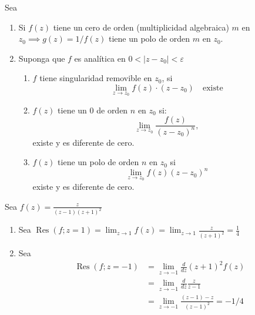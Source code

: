 \begin{nota}
    Sea 
    \begin{enumerate}
        \item Si $f(z)$ tiene un cero de orden (multiplicidad algebraica) $m$ en $z_0\implies g(z)=1/f(z)$ tiene un polo de orden $m$ en $z_0$.
        \item Suponga que $f$ es analítica en $0<|z-z_0|<\varepsilon$
        \begin{enumerate}
            \item $f$ tiene singularidad removible en $z_0$, si 
            $$\lim_{z\to z_0}f(z)\cdot (z-z_0)\quad \text{existe}$$
            \item $f(z)$ tiene un 0 de orden $n$ en $z_0$ si:
            $$\lim_{z\to z_0}\frac{f(z)}{(z-z_0)^n},$$
            existe y es diferente de cero. 
            \item $f(z)$ tiene un polo de orden $n$ en $z_0$ si 
            $$\lim_{z\to z_0}f(z)(z-z_0)^n$$
            existe y es diferente de cero.
        \end{enumerate}
    \end{enumerate}
\end{nota}
\begin{ejemplo}
    Sea $f(z)=\frac{z}{(z-1)(z+1)^2}$
    \begin{enumerate}
        \item Sea $\operatorname{Res}(f;z=1)=\lim_{z\to 1}f(z)=\lim_{z\to 1}\frac{z}{(z+1)^2}=\frac{1}{4}$
        \item Sea 
        \begin{align*}
            \operatorname{Res}(f;z=-1) &=\lim_{z\to -1}\frac{d}{dz}(z+1)^2 f(z)\\
            &=\lim_{z\to -1}\frac{d}{dz}\frac{z}{z-1}\\
            &= \lim_{z\to -1}\frac{(z-1)-z}{(z-1)^2} = -1/4
        \end{align*}

    \end{enumerate}
\end{ejemplo}

